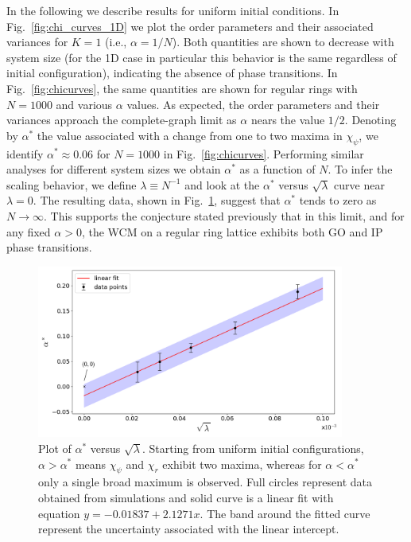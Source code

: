 In the following we describe results for uniform initial conditions. In Fig.~\ref{fig:chi_curves_1D} we plot the order parameters and
their associated variances for $K=1$ (i.e.,  $\alpha=1/N$). Both quantities are shown to decrease with system size (for the 1D case in
particular this behavior is the same regardless of initial configuration), indicating the absence of phase transitions. In
Fig.~\ref{fig:chicurves}, the same quantities are shown for regular rings with $N=1000$ and various $\alpha$ values.  As expected, the
order parameters and their variances approach the complete-graph limit as $\alpha$ nears the value $1/2$.  Denoting by $\alpha^*$ the
value associated with a change from one to two maxima in $\chi_{\psi}$, we identify $\alpha^* \approx 0.06$ for $N=1000$ in
Fig.~\ref{fig:chicurves}.  Performing similar analyses for different system sizes we obtain $\alpha^*$ as a function of $N$.  To infer
the scaling behavior, we define $\lambda \equiv N^{-1}$ and look at the $\alpha^*$ versus $\sqrt{\lambda}$ curve near $\lambda=0$. The
resulting data, shown in Fig.~\ref{fig:alphasplit}, suggest that $\alpha^*$ tends to zero as $N\to\infty$. This supports the conjecture
stated previously that in this limit, and for any fixed $\alpha>0$, the WCM on a regular ring lattice exhibits both GO and IP phase
transitions.

\begin{figure}
\begin{center}
    \includegraphics[width=0.9\textwidth]{fig/chap2/alphasplit.png}
    \caption{\label{fig:alphasplit} Plot of $\alpha^*$ versus $\sqrt{\lambda}$. Starting from uniform initial configurations, $\alpha >
        \alpha^*$ means $\chi_{\psi}$ and $\chi_r$ exhibit two maxima, whereas for $\alpha < \alpha^*$ only a single broad maximum is
        observed. Full circles represent data obtained from simulations and solid curve is a linear fit with equation
        $y=-0.01837+2.1271x$. The band around the fitted curve represent the uncertainty associated with the linear intercept.}
\end{center}
\end{figure}

